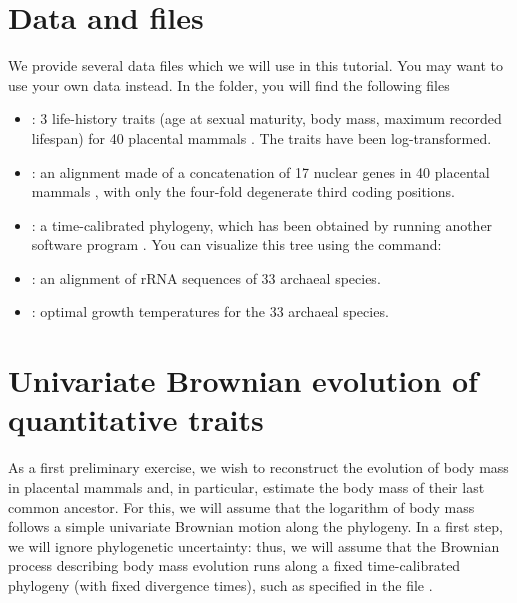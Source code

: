 \section{Data and files}

We provide several data files which we will use in this tutorial.
You may want to use your own data instead.
In the  folder, you will find the following files
\begin{itemize}
\item
{}: 3 life-history traits (age at sexual maturity, body mass, maximum recorded lifespan) for 40 placental mammals \citep[taken from the Anage database,][]{DeMagalhaes2009}. The traits have been log-transformed.
\item
{}: an alignment made of a concatenation of 17 nuclear genes in 40 placental mammals \citep[from][]{Lartillot2012}, with only the four-fold degenerate third coding positions.
\item
{}: a time-calibrated phylogeny, which has been obtained by running another software program \citep[PhyloBayes,][]{Lartillot2009}.
You can visualize this tree using the  command: 
\item
{}: an alignment of rRNA sequences of 33 archaeal species.
\item
{}: optimal growth temperatures for the 33 archaeal species.
\end{itemize}





\section{Univariate Brownian evolution of quantitative traits}

\label{univariate}

As a first preliminary exercise, we wish to reconstruct the evolution of body mass in placental mammals and, in particular, estimate the body mass of their last common ancestor.
For this, we will assume that the logarithm of body mass follows a simple univariate Brownian motion along the phylogeny.
In a first step, we will ignore phylogenetic uncertainty:
thus, we will assume that the Brownian process describing body mass evolution runs along a fixed time-calibrated phylogeny (with fixed divergence times), such as specified in the file .

